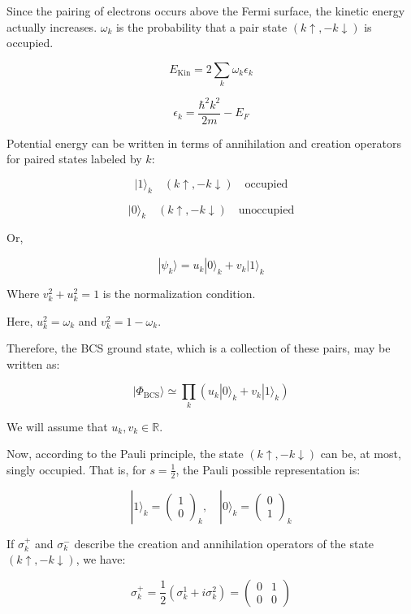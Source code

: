 \documentclass{article}
\begin{document}
Since the pairing of electrons occurs above the Fermi surface, the kinetic energy actually increases. \( \omega_k \) is the probability that a pair state \( (k \uparrow, -k \downarrow) \) is occupied.

\[
E_{\text{Kin}} = 2 \sum_k \omega_k \epsilon_k
\]

\[
\epsilon_k = \frac{\hbar^2 k^2}{2m} - E_F \tag{1}
\]

Potential energy can be written in terms of annihilation and creation operators for paired states labeled by \( k \):

\[
|1\rangle_k \quad (k \uparrow, -k \downarrow) \quad \text{occupied}
\]

\[
|0\rangle_k \quad (k \uparrow, -k \downarrow) \quad \text{unoccupied}
\]

Or,

\[
|\psi_k\rangle = u_k |0\rangle_k + v_k |1\rangle_k \tag{2}
\]

Where \( v_k^2 + u_k^2 = 1 \) is the normalization condition.

Here, \( u_k^2 = \omega_k \) and \( v_k^2 = 1 - \omega_k \).

Therefore, the BCS ground state, which is a collection of these pairs, may be written as:

\[
|\Phi_{\text{BCS}}\rangle \simeq \prod_k \left( u_k |0\rangle_k + v_k |1\rangle_k \right) \tag{3}
\]

We will assume that \( u_k, v_k \in \mathbb{R} \).

Now, according to the Pauli principle, the state \( (k \uparrow, -k \downarrow) \) can be, at most, singly occupied. That is, for \( s = \frac{1}{2} \), the Pauli possible representation is:

\[
|1\rangle_k = \begin{pmatrix} 1 \\ 0 \end{pmatrix}_k, \quad |0\rangle_k = \begin{pmatrix} 0 \\ 1 \end{pmatrix}_k
\]

If \( \sigma_k^+ \) and \( \sigma_k^- \) describe the creation and annihilation operators of the state \( (k \uparrow, -k \downarrow) \), we have:

\[
\sigma_k^+ = \frac{1}{2} \left( \sigma_k^1 + i \sigma_k^2 \right) = \begin{pmatrix} 0 & 1 \\ 0 & 0 \end{pmatrix}
\]
\end{document}
